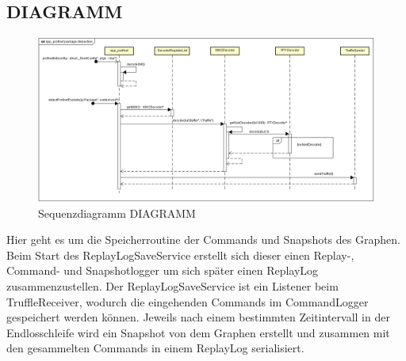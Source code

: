 \subsection{DIAGRAMM}
\begin{figure}[H]
  \centering
  \includegraphics[width=\textwidth]{../diagramimages/spp-profinet-package-dissection.png}
  \caption[Sequenzdiagramm DIAGRAMM]{Sequenzdiagramm DIAGRAMM}
\end{figure}

Hier geht es um die Speicherroutine der Commands und Snapshots des Graphen. Beim Start des ReplayLogSaveService erstellt sich dieser einen Replay-, Command- und Snapshotlogger um sich später einen ReplayLog zusammenzustellen. Der ReplayLogSaveService ist ein Listener beim TruffleReceiver, wodurch die eingehenden Commands im CommandLogger gespeichert werden können. Jeweils nach einem bestimmten Zeitintervall in der Endlosschleife wird ein Snapshot von dem Graphen erstellt und zusammen mit den gesammelten Commands in einem ReplayLog serialisiert. 